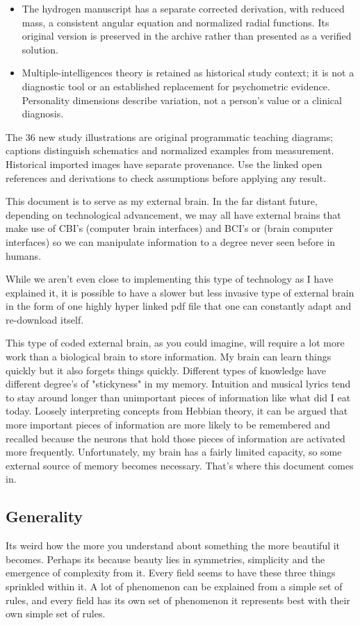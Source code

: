 \documentclass{article}
\begin{document}
\begin{itemize}
\item The hydrogen manuscript has a separate corrected derivation, with reduced mass, a consistent angular equation and normalized radial functions. Its original version is preserved in the archive rather than presented as a verified solution.
\item Multiple-intelligences theory is retained as historical study context; it is not a diagnostic tool or an established replacement for psychometric evidence. Personality dimensions describe variation, not a person's value or a clinical diagnosis.
\end{itemize}

The 36 new study illustrations are original programmatic teaching diagrams; captions distinguish schematics and normalized examples from measurement. Historical imported images have separate provenance. Use the linked open references and derivations to check assumptions before applying any result.

  This document is to serve as my external brain. In the far distant future, depending on technological advancement, we may all have external brains that make use of CBI's (computer brain interfaces) and BCI's or (brain computer interfaces) so we can manipulate information to a degree never seen before in humans. 
  
  While we aren't even close to implementing this type of technology as I have explained it, it is possible to have a slower but less invasive type of external brain in the form of one highly hyper linked pdf file that one can constantly adapt and re-download itself. 
  
  This type of coded external brain, as you could imagine, will require a lot more work than a biological brain to store information. My brain can learn things quickly but it also forgets things quickly. Different types of knowledge have different degree's of "stickyness" in my memory. Intuition and musical lyrics tend to stay around longer than unimportant pieces of information like what did I eat today. Loosely interpreting concepts from Hebbian theory, it can be argued that more important pieces of information are more likely to be remembered and recalled because the neurons that hold those pieces of information are activated more frequently. Unfortunately, my brain has a fairly limited capacity, so some external source of memory becomes necessary. That's where this document comes in. 

\subsection*{Generality}
Its weird how the more you understand about something the more beautiful it becomes. Perhaps its because beauty lies in symmetries, simplicity and the emergence of complexity from it. Every field seems to have these three things sprinkled within it. A lot of phenomenon can be explained from a simple set of rules, and every field has its own set of phenomenon it represents best with their own simple set of rules. 
\end{document}
